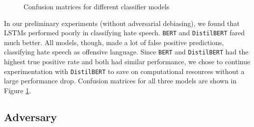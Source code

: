 \documentclass[11pt]{article}
\begin{document}
	\begin{figure}[htbp]%
		\qquad
		\qquad
		\centering\caption{Confusion matrices for different classifier models}\label{classifier_confusion}
	\end{figure}
	
	In our preliminary experiments (without adversarial debiasing), we found that LSTMs performed poorly in classifying hate speech. \texttt{BERT} and \texttt{DistilBERT} fared much better. All models, though, made a lot of false positive predictions, classifying hate speech as offensive language. Since \texttt{BERT} and \texttt{DistilBERT} had the highest true positive rate and both had similar performance, we chose to continue experimentation with \texttt{DistilBERT} to save on computational resources without a large performance drop. Confusion matrices for all three models are shown in Figure \ref{classifier_confusion}.
	
	\subsection{Adversary}
	
\end{document}
